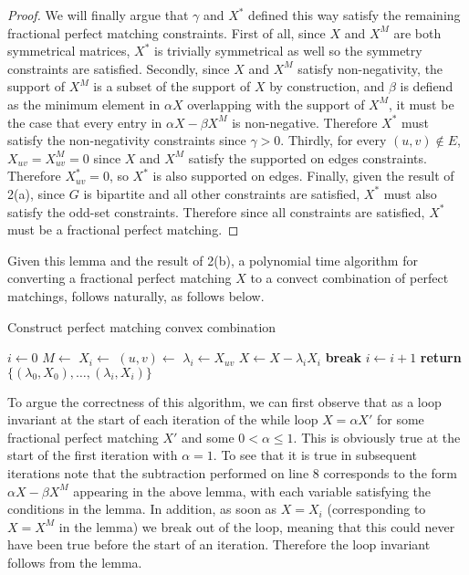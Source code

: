 \documentclass{hmcpset}
\begin{document}
\begin{solution}
\begin{enumerate}
\begin{proof}
  We will finally argue that $\gamma$ and $X^*$ defined this way satisfy
  the remaining fractional perfect matching constraints. First of all, since
  $X$ and $X^M$ are both symmetrical matrices, $X^*$ is trivially symmetrical
  as well so the symmetry constraints are satisfied. Secondly, since $X$
  and $X^M$ satisfy non-negativity, the support of $X^M$ is a subset of
  the support of $X$ by construction, and $\beta$ is defiend as the minimum
  element in $\alpha X$ overlapping with the support of $X^M$, it must
  be the case that every entry in
  $\alpha X - \beta X^M$ is non-negative. Therefore $X^*$ must satisfy
  the non-negativity constraints since
  $\gamma > 0$. Thirdly, for every $(u, v) \notin E$, $X_{uv} = X^M_{uv} = 0$
  since $X$ and $X^M$ satisfy the supported on edges constraints.
  Therefore $X^*_{uv} = 0$, so $X^*$ is also supported on edges. Finally, given
  the result of 2(a), since $G$ is bipartite and all other constraints
  are satisfied, $X^*$ must also satisfy the odd-set constraints.
  Therefore since all constraints are satisfied, $X^*$ must be a fractional
  perfect matching.
\end{proof}

Given this lemma and the result of 2(b), a polynomial time algorithm for
converting a fractional perfect matching $X$ to a convect combination of perfect
matchings, follows naturally, as follows below.

\begin{algorithm}
  \caption{Construct perfect matching convex combination}
  \begin{algorithmic}[1]
    \State $i\gets 0$
    \State $M\gets$ 
    \State $X_i\gets$ 
      \State $(u, v)\gets$ 
      \State $\lambda_i\gets X_{uv}$
      \State $X\gets X - \lambda_i X_i$
        \State \textbf{break}
      \EndIf
      \State $i\gets i + 1$
    \EndWhile
    \State \textbf{return} $\{(\lambda_0, X_0),\ldots,(\lambda_i, X_i)\}$
    \EndProcedure
  \end{algorithmic}
\end{algorithm}

To argue the correctness of this algorithm, we can first observe that as a loop
invariant at the start of each iteration of the while loop $X = \alpha X'$ for
some fractional perfect matching $X'$ and some $0 < \alpha \leq 1$. This
is obviously true at the start of the first iteration with $\alpha = 1$. To
see that it is true in subsequent iterations note that the subtraction performed
on line 8 corresponds to the form $\alpha X - \beta X^M$ appearing in the above
lemma, with each variable satisfying the conditions in the lemma. In addition, as soon
as $X = X_i$ (corresponding to $X = X^M$ in the lemma) we break out
of the loop, meaning that this could never have been true before the start
of an iteration. Therefore the loop invariant follows from the lemma.


\end{enumerate}
\end{solution}
\end{document}
